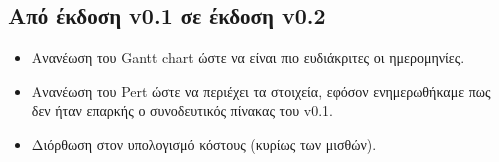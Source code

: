\documentclass[12pt,a4paper]{article}
\begin{document}
\subsection{Από έκδοση v0.1 σε έκδοση v0.2}
\begin{itemize}
    \item Ανανέωση του Gantt chart ώστε να είναι πιο ευδιάκριτες οι ημερομηνίες.
    \item Ανανέωση του Pert ώστε να περιέχει τα στοιχεία, εφόσον ενημερωθήκαμε πως δεν ήταν επαρκής ο συνοδευτικός πίνακας του v0.1.
    \item Διόρθωση στον υπολογισμό κόστους (κυρίως των μισθών).
\end{itemize}
\end{document}
